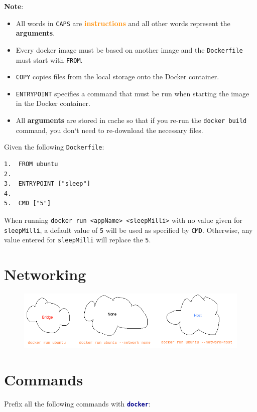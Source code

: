 \documentclass[a4paper, 12pt]{article}
\newcommand{\bc}[2]{\textbf{\textcolor{#1}{#2}}}
\begin{document}
\textbf{Note}:
\begin{itemize}
	\item All words in \texttt{CAPS} are \bc{darkorange}{instructions} and all
	other words represent the \bc{darkyellow}{arguments}.
	\item Every docker image must be based on another image and the
	\texttt{Dockerfile} must start with \texttt{FROM}.
	\item \texttt{COPY} copies files from the local storage onto the Docker
	container.
	\item \texttt{ENTRYPOINT} specifies a command that must be run when starting
	the image in the Docker container.
	\item All \bc{darkyellow}{arguments} are stored in cache so that if you
	re-run the \texttt{docker build} command, you don`t need to re-download the
	necessary files.
\end{itemize}

Given the following \texttt{Dockerfile}:
\begin{verbatim}
1.  FROM ubuntu
2.
3.  ENTRYPOINT ["sleep"]
4.
5.  CMD ["5"]
\end{verbatim}

When running \texttt{docker run <appName> <sleepMilli>} with no value given for
\texttt{sleepMilli}, a default value of \texttt{5} will be used as specified
by \texttt{CMD}. Otherwise, any value entered for \texttt{sleepMilli} will
replace the \texttt{5}.

\section{Networking}

\begin{figure}[H]
	\centering
	\includegraphics[scale=0.5]{network.png}
\end{figure}

\section{Commands}

Prefix all the following commands with \texttt{\bc{darkblue}{docker}}:
\end{document}
